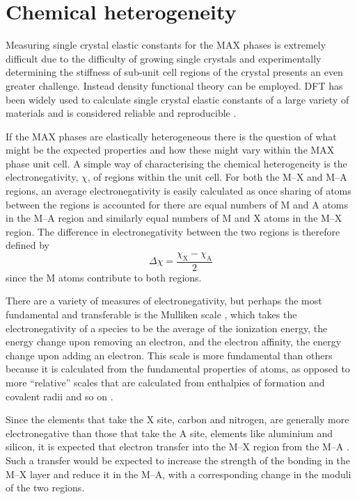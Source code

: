 \section{Chemical heterogeneity}

Measuring single crystal elastic constants for the MAX phases is extremely difficult due to the difficulty of growing single crystals and experimentally determining the stiffness of sub-unit cell regions of the crystal presents an even greater challenge. Instead density functional theory can be employed. DFT has been widely used to calculate single crystal elastic constants of a large variety of materials and is considered reliable and reproducible \cite{Lejaeghere2016}. 



If the MAX phases are elastically heterogeneous there is the question of what might be the expected properties and how these might vary within the MAX phase unit cell. A simple way of characterising the chemical heterogeneity is the electronegativity, $\chi$, of regions within the unit cell. For both the M--X and M--A regions, an average electronegativity is easily calculated as once sharing of atoms between the regions is accounted for there are equal numbers of M and A atoms in the M--A region and similarly equal numbers of M and X atoms in the M--X region. The difference in electronegativity between the two regions is therefore defined by
\begin{equation}
\Delta \chi = \frac{\chi_{\text{X}} - \chi_{\text{A}}}{2}\label{eqn:MAX_electronegativity_diff}
\end{equation}
since the M atoms contribute to both regions. 

There are a variety of measures of electronegativity, but perhaps the most fundamental and transferable is the Mulliken scale \cite{Mulliken1934}, which takes the electronegativity of a species to be the average of the ionization energy, the energy change upon removing an electron, and the electron affinity, the energy change upon adding an electron. This scale is more fundamental than others because it is calculated from the fundamental properties of atoms, as opposed to more ``relative'' scales that are calculated from enthalpies of formation and covalent radii and so on \cite{huheey1983ch3_electronegativity}.

Since the elements that take the X site, carbon and nitrogen, are generally more electronegative than those that take the A site, elements like aluminium and silicon, it is expected that electron transfer into the M--X region from the M--A \cite{Sun2011}. Such a transfer would be expected to increase the strength of the bonding in the M--X layer and reduce it in the M--A, with a corresponding change in the moduli of the two regions.


